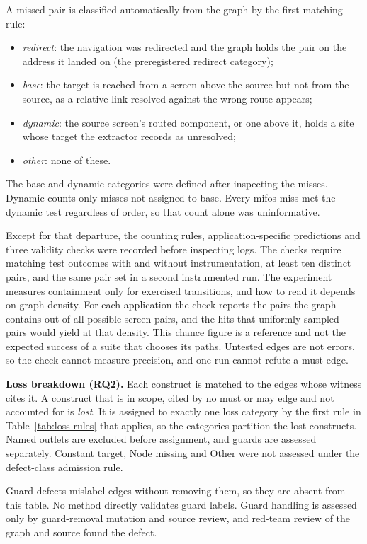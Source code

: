 A missed pair is classified automatically from the graph by the first matching rule:
\begin{itemize}
\item \emph{redirect}: the navigation was redirected and the graph holds the pair on the address it landed on (the preregistered redirect category);
\item \emph{base}: the target is reached from a screen above the source but not from the source, as a relative link resolved against the wrong route appears;
\item \emph{dynamic}: the source screen's routed component, or one above it, holds a site whose target the extractor records as unresolved;
\item \emph{other}: none of these.
\end{itemize} The base and dynamic categories were defined after inspecting the misses. Dynamic counts
only misses not assigned to base. Every mifos miss met the dynamic test regardless of order, so
that count alone was uninformative.

Except for that departure, the counting rules, application-specific predictions and three validity
checks were recorded before inspecting logs. The checks require matching test outcomes with and
without instrumentation, at least ten distinct pairs, and the same pair set in a second instrumented
run. The experiment measures containment only for exercised transitions, and how to read it
depends on graph density. For each application the check reports the pairs the
graph contains out of all possible screen pairs, and the hits that uniformly sampled pairs would
yield at that density. This chance figure is a reference and not the expected success of a suite
that chooses its paths. Untested edges are not errors, so the check cannot measure precision, and one run
cannot refute a must edge.

\textbf{Loss breakdown (RQ2).} Each construct is matched to the edges whose witness cites it. A
construct that is in scope, cited by no must or may edge and not accounted for is \emph{lost}. It is
assigned to exactly one loss category by the first rule in Table~\ref{tab:loss-rules} that applies,
so the categories partition the lost constructs. Named outlets are excluded before assignment, and
guards are assessed separately. Constant target, Node missing and Other were not assessed under
the defect-class admission rule.

Guard defects mislabel edges without removing them, so they are absent from this table. No method
directly validates guard labels. Guard handling is assessed only by guard-removal mutation and
source review, and red-team review of the graph and source found the
defect.

